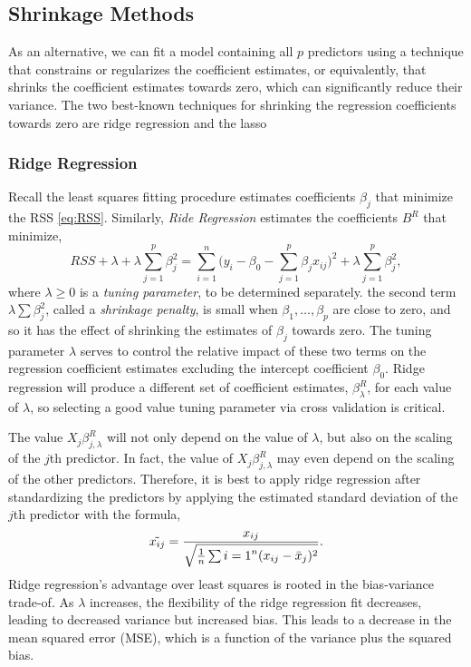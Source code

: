 \documentclass{article}
\numberwithin{equation}{section}
\begin{document}
\begin{enumerate}
\subsection{Shrinkage Methods}
As an alternative, we can fit a model containing all $p$ predictors using a technique that constrains or regularizes the coefficient estimates, or equivalently, that shrinks the coefficient estimates towards zero, which can significantly reduce their variance. The two best-known techniques for shrinking the regression coefficients towards zero are ridge regression and the lasso

\subsubsection{Ridge Regression}
Recall the least squares fitting procedure estimates coefficients $\beta_j$ that minimize the RSS \eqref{eq:RSS}. Similarly, \textit{Ride Regression} estimates the coefficients $B^R$ that minimize,
\begin{equation}
    RSS + \lambda + \lambda \sum_{j=1}^{p} \beta_j^2  
    = \sum_{i=1}^{n} \Bigg( y_i - \beta_0 - \sum_{j=1}^{p} \beta_j x_{ij} \Bigg )^2  
    + \lambda \sum_{j=1}^{p} \beta_j^2,
\end{equation}
where $\lambda \geq 0$ is a \textit{tuning parameter}, to be determined separately. the second term $\lambda \sum \beta_j^2$, called a \textit{shrinkage penalty}, is small when $\beta_1,\dots,\beta_p$ are close to zero, and so it has the effect of shrinking the estimates of $\beta_j$ towards zero. The tuning parameter $\lambda$ serves to control the relative impact of these two terms on the regression coefficient estimates excluding the intercept coefficient $\beta_0$. Ridge regression will produce a different set of coefficient estimates, $\beta^R_\lambda$, for each value of $\lambda$, so selecting a good value tuning parameter via cross validation is critical.

The value $X_j\beta^R_{j,\lambda}$ will not only depend on the value of $\lambda$, but also on the scaling of the $j$th predictor. In fact, the value of $X_j\beta^R_{j,\lambda}$ may even depend on the scaling of the other predictors. Therefore, it is best to apply ridge regression after standardizing the predictors by applying the estimated standard deviation of the $j$th predictor with the formula,
\begin{equation}
    \Tilde{x_{ij}} = \frac{x_{ij}}{\sqrt{\frac{1}{n} \sum{i=1}^{n} (x_{ij} - \bar x_j)^2}}.
\end{equation}
Ridge regression’s advantage over least squares is rooted in the bias-variance trade-of. As $\lambda$ increases, the flexibility of the ridge regression fit decreases, leading to decreased variance but increased bias. This leads to a decrease in the  mean squared error (MSE), which is a function of the variance plus the squared bias.


\end{enumerate}
\end{document}
